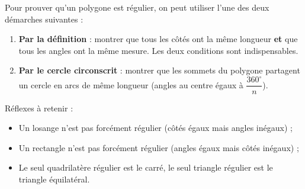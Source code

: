 \documentclass[11pt]{article}
\newcommand{\cle}[1]{{\popxbold\color{popdark}#1}}
\begin{document}
\begin{methode}
Pour prouver qu'un polygone est régulier, on peut utiliser l'une des deux démarches suivantes :
\begin{enumerate}
\item \textbf{Par la définition} : montrer que tous les côtés ont la même longueur \textbf{et} que tous les angles ont la même mesure. Les deux conditions sont indispensables.
\item \textbf{Par le cercle circonscrit} : montrer que les sommets du polygone partagent un cercle en arcs de même longueur (angles au centre égaux à $\dfrac{360^\circ}{n}$).
\end{enumerate}
Réflexes à retenir :
\begin{itemize}
\item Un losange n'est pas forcément régulier (côtés égaux mais angles inégaux) ;
\item Un rectangle n'est pas forcément régulier (angles égaux mais côtés inégaux) ;
\item Le seul quadrilatère régulier est le \cle{carré}, le seul triangle régulier est le \cle{triangle équilatéral}.
\end{itemize}
\end{methode}
\end{document}

